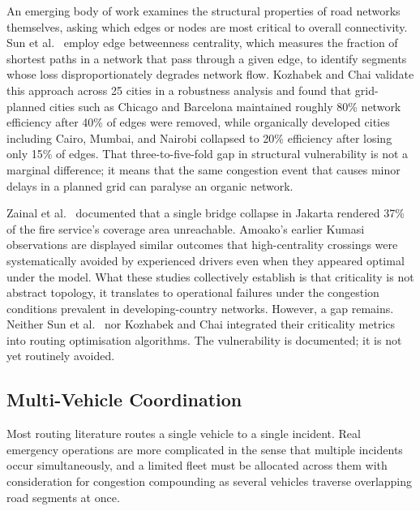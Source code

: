 \documentclass[paper=A4, 12pt, mathscr]{report}
\begin{document}
	An emerging body of work examines the structural properties of road networks
	themselves, asking which edges or nodes are most critical to overall
	connectivity. Sun et al.\ \cite{6} employ edge betweenness centrality, which
	measures the fraction of shortest paths in a network that pass through a
	given edge, to identify segments whose loss disproportionately degrades
	network flow. Kozhabek and Chai \cite{11} validate this approach across 25
	cities in a robustness analysis and found that grid-planned
	cities such as Chicago and Barcelona maintained roughly 80\% network
	efficiency after 40\% of edges were removed, while organically developed
	cities including Cairo, Mumbai, and Nairobi collapsed to 20\% efficiency
	after losing only 15\% of edges. That three-to-five-fold gap in structural
	vulnerability is not a marginal difference; it means that the same congestion
	event that causes minor delays in a planned grid can paralyse an organic
	network.
	
	Zainal et al.\ \cite{zainal2022} documented that a single bridge
	collapse in Jakarta rendered 37\% of the fire service's coverage area
	unreachable. Amoako's earlier Kumasi observations are displayed similar outcomes that high-centrality
	crossings were systematically avoided by experienced drivers even when they
	appeared optimal under the model. What these studies collectively establish
	is that criticality is not abstract topology, it translates to operational
	failures under the congestion conditions prevalent in developing-country
	networks. However, a gap remains. Neither Sun et al.\ \cite{6} nor Kozhabek
	and Chai \cite{11} integrated their criticality metrics into routing
	optimisation algorithms. The vulnerability is documented; it is not yet
	routinely avoided.
	
	\subsection*{Multi-Vehicle Coordination}
	
	Most routing literature routes a single vehicle to a single incident. Real
	emergency operations are more complicated in the sense that multiple incidents occur
	simultaneously, and a limited fleet must be allocated across them with
	consideration for congestion compounding as several vehicles traverse
	overlapping road segments at once.
	
\end{document}
